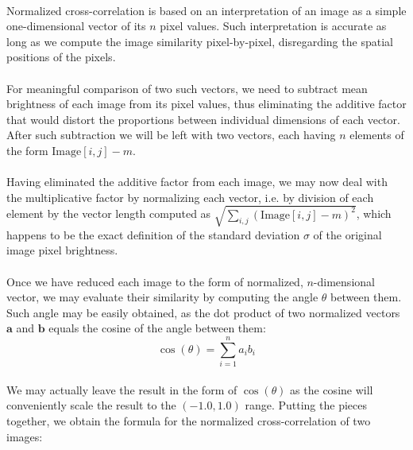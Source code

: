 \paragraph*{}
Normalized cross-correlation is based on an interpretation of an image as a simple one-dimensional vector of its $n$ pixel values. Such interpretation is accurate as long as we compute the image similarity pixel-by-pixel, disregarding the spatial positions of the pixels.

\paragraph*{}
For meaningful comparison of two such vectors, we need to subtract mean brightness of each image from its pixel values, thus eliminating the additive factor that would distort the proportions between individual dimensions of each vector. After such subtraction we will be left with two vectors, each having $n$ elements of the form $\mbox{Image}[i,j] - m$.

\paragraph*{}
Having eliminated the additive factor from each image, we may now deal with the multiplicative factor by normalizing each vector, i.e. by division of each element by the vector length computed as $\sqrt{\sum_{i,j} (\mbox{Image}[i,j] - m)^2}$, which happens to be the exact definition of the standard deviation $\sigma$ of the original image pixel brightness.

\paragraph*{}
Once we have reduced each image to the form of normalized, $n$-dimensional vector, we may evaluate their similarity by computing the angle $\theta$ between them. Such angle may be easily obtained, as the dot product of two normalized vectors $\mathbf{a}$ and $\mathbf{b}$ equals the cosine of the angle between them:
\[
	\cos(\theta) = \sum_{i=1}^n a_i b_i
\] 

\paragraph*{}
We may actually leave the result in the form of $\cos(\theta)$ as the cosine will conveniently scale the result to the $(-1.0, 1.0)$ range. Putting the pieces together, we obtain the formula for the normalized cross-correlation of two images:

